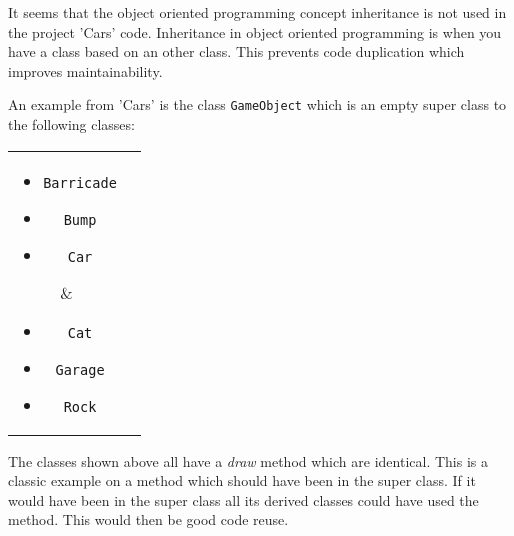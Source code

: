 \label{sprint1_inheritance}
It seems that the object oriented programming concept inheritance is not used in the project 'Cars' code.
Inheritance in object oriented programming is when you have a class based on an other class.
This prevents code duplication which improves maintainability.

An example from 'Cars' is the class \lstinline!GameObject! which is an empty super class to the following classes:

\begin{tabular}{ c  c }
\parbox{\textwidth/2}{
\begin{itemize}
\item \lstinline!Barricade!
\item \lstinline!Bump!
\item \lstinline!Car!
\end{itemize}} &
\parbox{\textwidth/2}{
\begin{itemize}
\item \lstinline!Cat!
\item \lstinline!Garage!
\item \lstinline!Rock!
\end{itemize}
}
\end{tabular}
The classes shown above all have a \textit{draw} method which are identical.
This is a classic example on a method which should have been in the super class.
If it would have been in the super class all its derived classes could have used the method.
This would then be good code reuse.